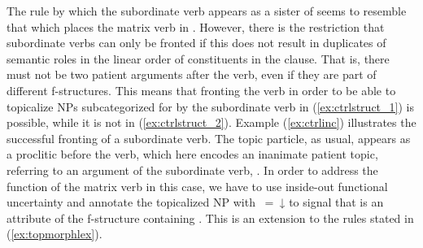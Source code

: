 
The rule by which the subordinate verb appears as a sister of  seems to
resemble that which places the matrix verb in . However, there is the
restriction that subordinate verbs can only be fronted if this does not result
in duplicates of semantic roles in the linear order of constituents in the
clause. That is, there must not be two patient
arguments after the verb, even if they are part of different f-structures. This
means that fronting the verb in order to be able to
topicalize NPs
subcategorized for by the subordinate verb in (\ref{ex:ctrlstruct_1}) is
possible, while it is not in (\ref{ex:ctrlstruct_2}). Example (\ref{ex:ctrlinc})
illustrates the successful fronting of a subordinate verb. The
topic particle, as usual, appears as a
proclitic before the verb, which here encodes an inanimate
patient topic, referring to an argument of the subordinate verb,
. In order to address the \Top{} function of the
matrix verb in this case, we have to use inside-out functional uncertainty and
annotate the topicalized NP with \uncertain{\XCompl}{\Top}~=~↓ to signal that \Top{} is
an attribute of the f-structure containing \XCompl{}. This is an extension to the rules stated in
(\ref{ex:topmorphlex}).

